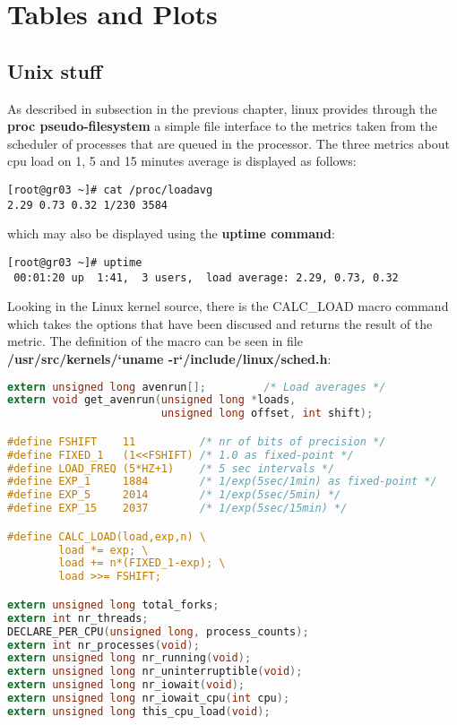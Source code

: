 \section{Tables and Plots}
\subsection{Unix stuff}

As described in subsection  in the previous chapter, linux provides through the {\bf proc pseudo-filesystem} a simple file interface to the metrics taken from the scheduler of processes that are queued in the processor. The three metrics about cpu load on 1, 5 and 15 minutes average is displayed as follows:

\begin{verbatim}
[root@gr03 ~]# cat /proc/loadavg 
2.29 0.73 0.32 1/230 3584
\end{verbatim}

which may also be displayed using the {\bf uptime command}:

\begin{verbatim}
[root@gr03 ~]# uptime
 00:01:20 up  1:41,  3 users,  load average: 2.29, 0.73, 0.32
\end{verbatim}

Looking in the Linux kernel source, there is the CALC\_LOAD macro command which takes the options that have been discused and returns the result of the metric. The definition of the macro can be seen in file {\bf /usr/src/kernels/`uname -r`/include/linux/sched.h}:

\begin{lstlisting}[language=C,caption=Linux kernel CALC\_LOAD macro]
extern unsigned long avenrun[];         /* Load averages */
extern void get_avenrun(unsigned long *loads, 
                        unsigned long offset, int shift);

#define FSHIFT    11          /* nr of bits of precision */
#define FIXED_1   (1<<FSHIFT) /* 1.0 as fixed-point */
#define LOAD_FREQ (5*HZ+1)    /* 5 sec intervals */
#define EXP_1     1884        /* 1/exp(5sec/1min) as fixed-point */
#define EXP_5     2014        /* 1/exp(5sec/5min) */
#define EXP_15    2037        /* 1/exp(5sec/15min) */

#define CALC_LOAD(load,exp,n) \
        load *= exp; \
        load += n*(FIXED_1-exp); \
        load >>= FSHIFT;

extern unsigned long total_forks;
extern int nr_threads;
DECLARE_PER_CPU(unsigned long, process_counts);
extern int nr_processes(void);
extern unsigned long nr_running(void);
extern unsigned long nr_uninterruptible(void);
extern unsigned long nr_iowait(void);
extern unsigned long nr_iowait_cpu(int cpu);
extern unsigned long this_cpu_load(void);
\end{lstlisting}

